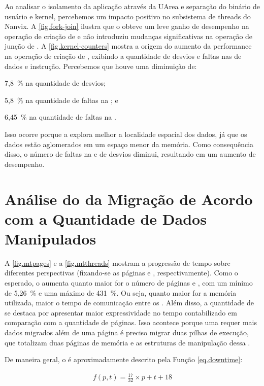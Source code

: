 Ao analisar o isolamento da aplicação através da UArea e separação do binário de usuário e kernel, percebemos um impacto positivo no subsistema de threads do Nanvix. A \autoref{fig.fork-join} ilustra que o \nanvix obteve um leve ganho de desempenho na operação de criação de \threads e não introduziu mudanças significativas na operação de junção de \threads. A \autoref{fig.kernel-counters} mostra a origem do aumento da performance na operação de criação de \threads, exibindo a quantidade de desvios e faltas nas \caches de dados e instrução. Percebemos que houve uma diminuição de:
\begin{inlinelist}
    \item 7,8~\% na quantidade de desvios;
    \item 5,8~\% na quantidade de faltas na \dcache; e
    \item 6,45~\% na quantidade de faltas na \icache.
\end{inlinelist}
Isso ocorre porque a \uarea explora melhor a localidade espacial dos dados, já que os dados estão aglomerados em um espaço menor da memória. Como consequência disso, o número de faltas na \cache e de desvios diminui, resultando em um aumento de desempenho.

\section{Análise do \downtime da Migração de Acordo com a Quantidade de Dados Manipulados}

A \autoref{fig.mtpages} e a \autoref{fig.mtthreads} mostram a progressão de tempo sobre diferentes perspectivas (fixando-se as páginas e \threads, respectivamente). Como o esperado, o \downtime aumenta quanto maior for o número de páginas e \threads, com um mínimo de 5,26~\% e uma máximo de 431~\%. Ou seja, quanto maior for a memória utilizada, maior o tempo de comunicação entre os \clusters. Além disso, a quantidade de \threads se destaca por apresentar maior expressividade no tempo contabilizado em comparação com a quantidade de páginas. Isso acontece porque uma \thread requer mais dados migrados além de uma página \eg é preciso migrar duas pilhas de execução, que totalizam duas páginas de memória e as estruturas de manipulação dessa \thread.

De maneira geral, o \downtime é aproximadamente descrito pela Função \ref{eq.downtime}:

\begin{equation}\label{eq.downtime}
    \begin{split}
        f(p, t) = \frac{17}{32} \times p+t+18
    \end{split}
\end{equation}

